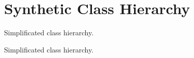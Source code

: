 \hypertarget{group__grpSynthHierarchy}{}\section{Synthetic Class Hierarchy}
\label{group__grpSynthHierarchy}


Simplificated class hierarchy.  


Simplificated class hierarchy. 

 